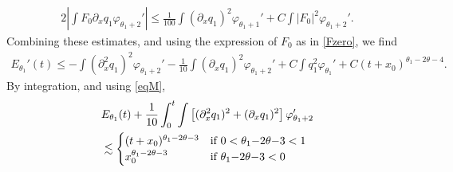 \documentclass[11pt,a4paper,reqno]{amsart}
\theoremstyle{remark}
\numberwithin{equation}{section}
\begin{document}
\begin{align*}
2 \left| \int F_0 \partial_x q_1 \varphi_{\theta_1+2}'\right| \leq
\frac 1{100} \int (\partial_x q_1)^2 \varphi_{\theta_1+1}' + C \int |F_0|^2\varphi_{\theta_1+2}'.
\end{align*}
Combining these estimates, and using the expression of $F_0$ as in \eqref{Fzero}, we find
\begin{align*}
E_{\theta_1}'(t) \leq - \int (\partial_x^2 q_1)^2 \varphi_{\theta_1+2}' - \frac 1{10} \int (\partial_x q_1)^2 \varphi_{\theta_1+2}' 
+ C\int q_1^2 \varphi_{\theta_1}' + C  (t+x_0)^{ \theta_1 -2 \theta-4 }.
\end{align*}
By integration, and using \eqref{eqM},
\begin{align}
& E_{\theta_1}(t) + \frac 1{10} \int_0^t \int \left[(\partial_x^2 q_1)^2 + (\partial_x q_1)^2 \right]\varphi_{\theta_1+2}'\nonumber \\
& \lesssim \begin{cases} (t+x_0)^{ \theta_1 -2 \theta-3 } & \hbox{if $0<\theta_1 {-}2 \theta{-}3<1$}  \\
  x_0^{ \theta_1 -2 \theta-3 } & \hbox{if $\theta_1 {-}2 \theta{-}3<0$} \end{cases}\label{eqE}
\end{align}
  
\end{document}

